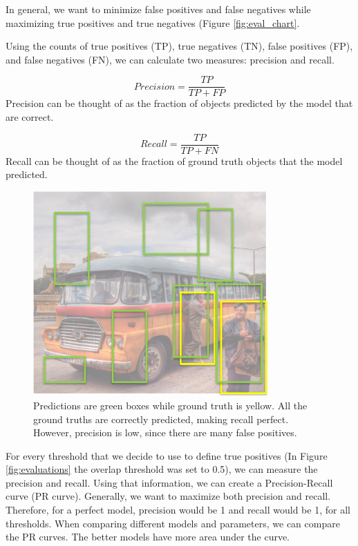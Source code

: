 \documentclass{article}
\begin{document}
In general, we want to minimize false positives and false negatives while maximizing true positives and true negatives (Figure \ref{fig:eval_chart}.

Using the counts of true positives (TP), true negatives (TN), false positives (FP), and false negatives (FN), we can calculate two measures: precision and recall.

$$Precision = \frac{TP}{TP + FP}$$
Precision can be thought of as the fraction of objects predicted by the model that are correct.

$$Recall = \frac{TP}{TP + FN}$$
Recall can be thought of as the fraction of ground truth objects that the model predicted. \\

\begin{figure}[ht]
\centering
	\includegraphics[width=0.8\textwidth]{prec_recall_pic.jpg}
    \caption{Predictions are green boxes while ground truth is yellow. All the ground truths are correctly predicted, making recall perfect. However, precision is low, since there are many false positives.}
\end{figure}

For every threshold that we decide to use to define true positives (In Figure \ref{fig:evaluations} the overlap threshold was set to 0.5), we can measure the precision and recall. Using that information, we can create a Precision-Recall curve (PR curve). Generally, we want to maximize both precision and recall. Therefore, for a perfect model, precision would be 1 and recall would be 1, for all thresholds. When comparing different models and parameters, we can compare the PR curves. The better models have more area under the curve. 
\end{document}

